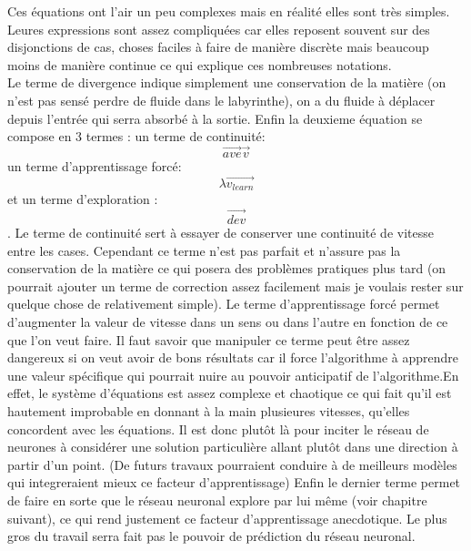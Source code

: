 \documentclass[12pt]{article}
\begin{document}
Ces équations ont l'air un peu complexes mais en réalité elles sont très simples. Leures expressions sont assez compliquées car elles reposent souvent sur des disjonctions de cas, choses faciles à faire de manière discrète mais beaucoup moins de manière continue ce qui explique ces nombreuses notations.\\ Le terme de divergence indique simplement une conservation de la matière (on n'est pas sensé perdre de fluide dans le labyrinthe), on a du fluide à déplacer depuis l'entrée qui serra absorbé à la sortie. Enfin la deuxieme équation se compose en 3 termes : un terme de continuité: 
\[\overrightarrow{ave}\overrightarrow{v}\]
un terme d'apprentissage forcé:
\[\lambda\overrightarrow{v_{learn}}\]
et un terme d'exploration :
\[\overrightarrow{dev}\].
Le terme de continuité sert à essayer de conserver une continuité de vitesse entre les cases. Cependant ce terme n'est pas parfait et n'assure pas la conservation de la matière ce qui posera des problèmes pratiques plus tard (on pourrait ajouter un terme de correction assez facilement mais je voulais rester sur quelque chose de relativement simple). Le terme d'apprentissage forcé permet d'augmenter la valeur de vitesse dans un sens ou dans l'autre en fonction de ce que l'on veut faire. Il faut savoir que manipuler ce terme peut être assez dangereux si on veut avoir de bons résultats car il force l'algorithme à apprendre une valeur spécifique qui pourrait nuire au pouvoir anticipatif de l'algorithme.En effet, le système d'équations est assez complexe et chaotique ce qui fait qu'il est hautement improbable en donnant à la main plusieures vitesses, qu'elles concordent avec les équations. Il est donc plutôt là pour inciter le réseau de neurones à considérer une solution particulière allant plutôt dans une direction à partir d'un point. (De futurs travaux pourraient conduire à de meilleurs modèles qui integreraient mieux ce facteur d'apprentissage) Enfin le dernier terme permet de faire en sorte que le réseau neuronal explore par lui même (voir chapitre suivant), ce qui rend justement ce facteur d'apprentissage anecdotique. Le plus gros du travail serra fait pas le pouvoir de prédiction du réseau neuronal.
\end{document}
